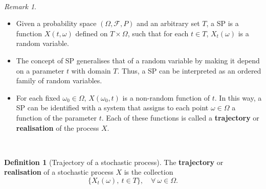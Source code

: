 \documentclass[
  11pt,
  a4paper,
]{book}
\theoremstyle{definition}
\newtheorem{definition}{Definition}[chapter]
\theoremstyle{definition}
\theoremstyle{definition}
\theoremstyle{definition}
\theoremstyle{remark}
\newtheorem*{remark}{Remark}
\begin{document}
\(\,\)

\begin{remark}
\leavevmode

\begin{itemize}
\item
  Given a probability space \((\Omega, \mathcal{F}, P)\) and an arbitrary set \(T\), a SP is a function \(X(t,\omega)\) defined on \(T \times \Omega\), such that for each \(t \in T\), \(X_t(\omega)\) is a random variable.
\item
  The concept of SP generalises that of a random variable by making it depend on a parameter \(t\) with domain \(T\). Thus, a SP can be interpreted as an ordered family of random variables.
\item
  For each fixed \(\omega_0 \in \Omega\), \(X(\omega_0, t)\) is a non-random function of \(t\). In this way, a SP can be identified with a system that assigns to each point \(\omega \in \Omega\) a function of the parameter \(t\). Each of these functions is called a \textbf{trajectory} or \textbf{realisation} of the process \(X\).
\end{itemize}

\end{remark}

\(\,\)

\begin{definition}[Trajectory of a stochastic process]
The \textbf{trajectory} or \textbf{realisation} of a stochastic process \(X\) is the collection
\[
\{X_t(\omega), ~ t \in T\}, \quad \forall ~ \omega \in \Omega.
\]
\end{definition}

\(\,\)
\end{document}
